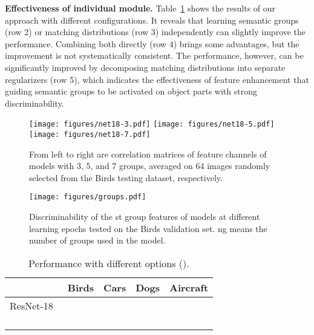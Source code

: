 \documentclass[journal]{IEEEtran}
\begin{document}
\textbf{Effectiveness of individual module.}
Table~\ref{tab:ablation} shows the results of our approach with different configurations. It reveals that learning semantic groups (row 2) or matching distributions (row 3) independently can slightly improve the performance. Combining both directly (row 4) brings some advantages, but the improvement is not systematically consistent. The performance, however, can be significantly improved by decomposing matching distributions into separate regularizers (row 5), which indicates the effectiveness of feature enhancement that guiding semantic groups to be activated on object parts with strong discriminability. \begin{figure}[t]
\centering
\texttt{[image: figures/net18-3.pdf]} \texttt{[image: figures/net18-5.pdf]} \texttt{[image: figures/net18-7.pdf]} 
\caption{From left to right are correlation matrices of feature channels of models with 3, 5, and 7 groups, averaged on 64 images randomly selected from the Birds testing dataset, respectively.}
\label{fig:correlations}
\end{figure}


\begin{figure}[t]
\centering
\texttt{[image: figures/groups.pdf]}
\caption{Discriminability of the st group features of models at different learning epochs tested on the Birds validation set. ng means the number of groups used in the model.}
\label{fig:ngroups}
\end{figure}

\begin{table}[h]
    \centering
    \caption{Performance with different options ().}
    \begin{threeparttable}
        \begin{tabular}{lcccc}
        \toprule
                    &Birds & Cars & Dogs &Aircraft \\
        \midrule
        ResNet-18~\cite{resnet16kaiming}            &         &           &           &\\
                       &         &           &           &\\
                 &         &           &           &\\
                 &         &           &           &\\
                    &         &           &           &\\
        \bottomrule
        \end{tabular}
\end{threeparttable}
    \label{tab:ablation}
\end{table}
\end{document}
